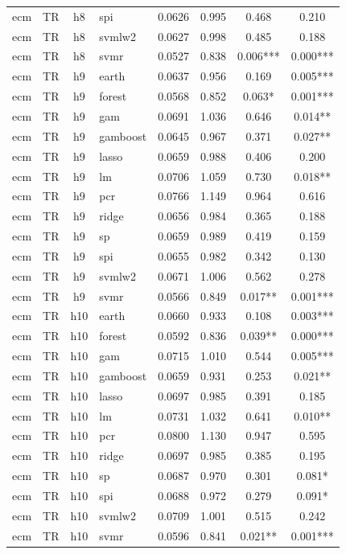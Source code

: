 \begin{ThreePartTable}
\begin{longtable}[t]{llclcccc}
ecm & TR & h8 & spi & 0.0626 & 0.995 & 0.468 & 0.210\\
ecm & TR & h8 & svmlw2 & 0.0627 & 0.998 & 0.485 & 0.188\\
ecm & TR & h8 & svmr & 0.0527 & 0.838 & 0.006*** & 0.000***\\
\addlinespace
ecm & TR & h9 & earth & 0.0637 & 0.956 & 0.169 & 0.005***\\
ecm & TR & h9 & forest & 0.0568 & 0.852 & 0.063* & 0.001***\\
ecm & TR & h9 & gam & 0.0691 & 1.036 & 0.646 & 0.014**\\
ecm & TR & h9 & gamboost & 0.0645 & 0.967 & 0.371 & 0.027**\\
ecm & TR & h9 & lasso & 0.0659 & 0.988 & 0.406 & 0.200\\
ecm & TR & h9 & lm & 0.0706 & 1.059 & 0.730 & 0.018**\\
ecm & TR & h9 & pcr & 0.0766 & 1.149 & 0.964 & 0.616\\
ecm & TR & h9 & ridge & 0.0656 & 0.984 & 0.365 & 0.188\\
ecm & TR & h9 & sp & 0.0659 & 0.989 & 0.419 & 0.159\\
ecm & TR & h9 & spi & 0.0655 & 0.982 & 0.342 & 0.130\\
ecm & TR & h9 & svmlw2 & 0.0671 & 1.006 & 0.562 & 0.278\\
ecm & TR & h9 & svmr & 0.0566 & 0.849 & 0.017** & 0.001***\\
\addlinespace
ecm & TR & h10 & earth & 0.0660 & 0.933 & 0.108 & 0.003***\\
ecm & TR & h10 & forest & 0.0592 & 0.836 & 0.039** & 0.000***\\
ecm & TR & h10 & gam & 0.0715 & 1.010 & 0.544 & 0.005***\\
ecm & TR & h10 & gamboost & 0.0659 & 0.931 & 0.253 & 0.021**\\
ecm & TR & h10 & lasso & 0.0697 & 0.985 & 0.391 & 0.185\\
ecm & TR & h10 & lm & 0.0731 & 1.032 & 0.641 & 0.010**\\
ecm & TR & h10 & pcr & 0.0800 & 1.130 & 0.947 & 0.595\\
ecm & TR & h10 & ridge & 0.0697 & 0.985 & 0.385 & 0.195\\
ecm & TR & h10 & sp & 0.0687 & 0.970 & 0.301 & 0.081*\\
ecm & TR & h10 & spi & 0.0688 & 0.972 & 0.279 & 0.091*\\
ecm & TR & h10 & svmlw2 & 0.0709 & 1.001 & 0.515 & 0.242\\
ecm & TR & h10 & svmr & 0.0596 & 0.841 & 0.021** & 0.001***\\

\end{longtable}
\end{ThreePartTable}
